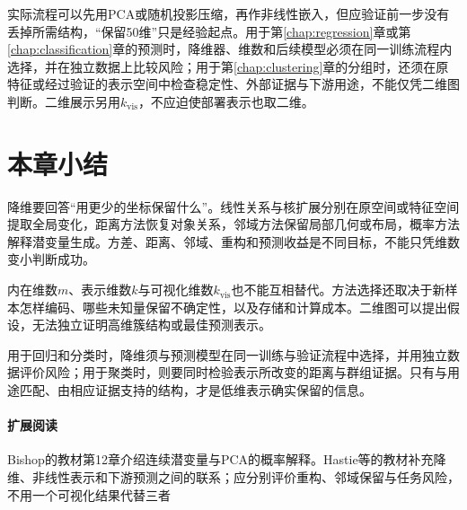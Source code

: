 实际流程可以先用PCA或随机投影压缩，再作非线性嵌入，但应验证前一步没有丢掉所需结构，“保留50维”只是经验起点。用于第\ref{chap:regression}章或第\ref{chap:classification}章的预测时，降维器、维数和后续模型必须在同一训练流程内选择，并在独立数据上比较风险；用于第\ref{chap:clustering}章的分组时，还须在原特征或经过验证的表示空间中检查稳定性、外部证据与下游用途，不能仅凭二维图判断。二维展示另用$k_{\mathrm{vis}}$，不应迫使部署表示也取二维。

\section{本章小结}
\label{sec:dim-summary}

降维要回答“用更少的坐标保留什么”。线性关系与核扩展分别在原空间或特征空间提取全局变化，距离方法恢复对象关系，邻域方法保留局部几何或布局，概率方法解释潜变量生成。方差、距离、邻域、重构和预测收益是不同目标，不能只凭维数变小判断成功。

内在维数$m$、表示维数$k$与可视化维数$k_{\mathrm{vis}}$也不能互相替代。方法选择还取决于新样本怎样编码、哪些未知量保留不确定性，以及存储和计算成本。二维图可以提出假设，无法独立证明高维簇结构或最佳预测表示。

用于回归和分类时，降维须与预测模型在同一训练与验证流程中选择，并用独立数据评价风险；用于聚类时，则要同时检验表示所改变的距离与群组证据。只有与用途匹配、由相应证据支持的结构，才是低维表示确实保留的信息。

\paragraph{扩展阅读}
Bishop的教材第12章介绍连续潜变量与PCA的概率解释。Hastie等的教材补充降维、非线性表示和下游预测之间的联系；应分别评价重构、邻域保留与任务风险，不用一个可视化结果代替三者
